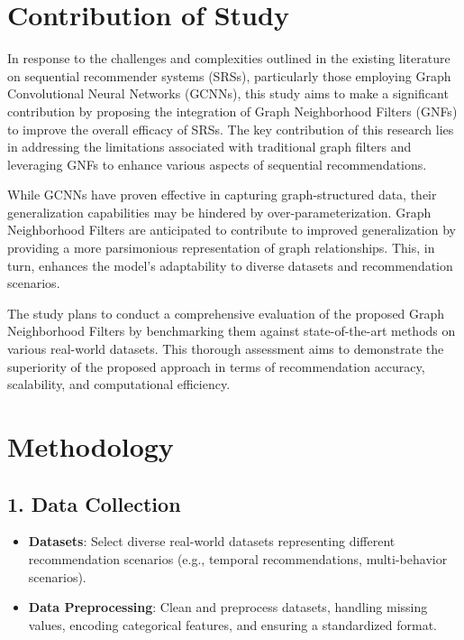 \documentclass[journal]{IEEEtran}
\begin{document}

\section{Contribution of Study}

In response to the challenges and complexities outlined in the existing literature on sequential recommender systems (SRSs), 
particularly those employing Graph Convolutional Neural Networks (GCNNs), this study aims to make a significant contribution by 
proposing the integration of Graph Neighborhood Filters (GNFs) \cite{tenorio2021robust} to improve the overall efficacy of SRSs. The key contribution of 
this research lies in addressing the limitations associated with traditional graph filters and leveraging GNFs to enhance various 
aspects of sequential recommendations.

While GCNNs have proven effective in capturing graph-structured data, their generalization capabilities may be hindered by 
over-parameterization. Graph Neighborhood Filters are anticipated to contribute to improved generalization by providing a more 
parsimonious representation of graph relationships. This, in turn, enhances the model's adaptability to diverse datasets and 
recommendation scenarios.

The study plans to conduct a comprehensive evaluation of the proposed Graph Neighborhood Filters by benchmarking them against 
state-of-the-art methods on various real-world datasets. This thorough assessment aims to demonstrate the superiority of the 
proposed approach in terms of recommendation accuracy, scalability, and computational efficiency.




\section{Methodology}

\subsection*{1. Data Collection}

\begin{itemize}
  \item \textbf{Datasets}: Select diverse real-world datasets representing different recommendation scenarios (e.g., temporal recommendations, multi-behavior scenarios).
  \item \textbf{Data Preprocessing}: Clean and preprocess datasets, handling missing values, encoding categorical features, and ensuring a standardized format.
\end{itemize}
\end{document}
